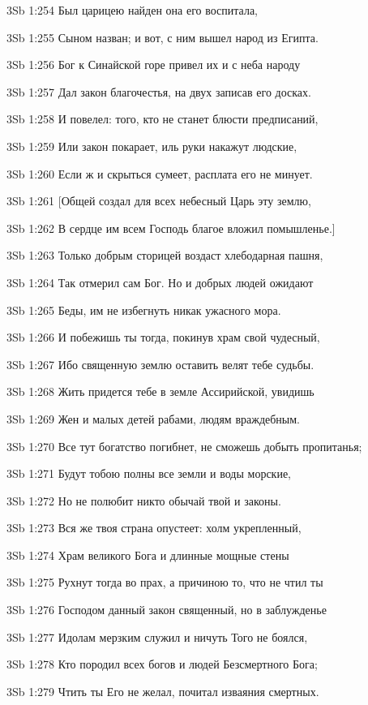 \vs 3Sb 1:254 Был царицею найден  она его воспитала,

\vs 3Sb 1:255 Сыном назван; и вот, с ним вышел народ из Египта. 

\vs 3Sb 1:256 Бог к Синайской горе привел их и с неба народу 

\vs 3Sb 1:257 Дал закон благочестья, на двух записав его досках. 

\vs 3Sb 1:258 И повелел: того, кто не станет блюсти предписаний,

\vs 3Sb 1:259 Или закон покарает, иль руки накажут людские,

\vs 3Sb 1:260 Если ж и скрыться сумеет, расплата его не минует. 

\vs 3Sb 1:261 [Общей создал для всех небесный Царь эту землю, 

\vs 3Sb 1:262 В сердце им всем Господь благое вложил помышленье.] 

\vs 3Sb 1:263 Только добрым сторицей воздаст хлебодарная пашня, 

\vs 3Sb 1:264 Так отмерил сам Бог. Но и добрых людей ожидают

\vs 3Sb 1:265 Беды, им не избегнуть никак ужасного мора.

\vs 3Sb 1:266 И побежишь ты тогда, покинув храм свой чудесный, 

\vs 3Sb 1:267 Ибо священную землю оставить велят тебе судьбы. 

\vs 3Sb 1:268 Жить придется тебе в земле Ассирийской, увидишь 

\vs 3Sb 1:269 Жен и малых детей рабами, людям враждебным.

\vs 3Sb 1:270 Все тут богатство погибнет, не сможешь добыть пропитанья; 

\vs 3Sb 1:271 Будут тобою полны все земли и воды морские, 

\vs 3Sb 1:272 Но не полюбит никто обычай твой и законы. 

\vs 3Sb 1:273 Вся же твоя страна опустеет: холм укрепленный, 

\vs 3Sb 1:274 Храм великого Бога и длинные мощные стены

\vs 3Sb 1:275 Рухнут тогда во прах, а причиною  то, что не чтил ты 

\vs 3Sb 1:276 Господом данный закон священный, но в заблужденье 

\vs 3Sb 1:277 Идолам мерзким служил и ничуть Того не боялся, 

\vs 3Sb 1:278 Кто породил всех богов и людей  Безсмертного Бога; 

\vs 3Sb 1:279 Чтить ты Его не желал, почитал изваяния смертных.

